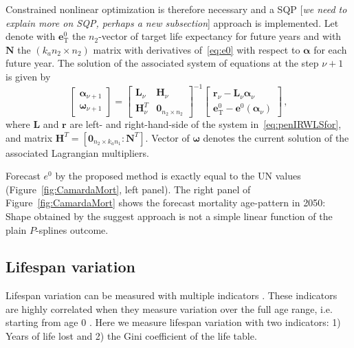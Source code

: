 \documentclass[a4paper,twoside, openright, 12pt, leqno]{article}
\begin{document}
Constrained nonlinear optimization is therefore necessary and a SQP [\textit{we need to explain more on SQP, perhaps a new subsection}] approach is implemented. Let denote with $\bm{e}^{0}_{\mathrm{T}}$ the $n_{2}$-vector of target life expectancy for future years and with $\bm{N}$ the $(k_{a}n_{2} \times n_{2})$ matrix with derivatives of~\eqref{eq:e0} with respect to $\bm{\alpha}$ for each future year. The solution of the associated system of equations at the step $\nu + 1$ is given by
\begin{equation}\label{eq:SQLalg}
\left[ \begin{array}{l}
\bm{\alpha}_{\nu+1}\\
\bm{\omega}_{\nu+1}
\end{array}\right] = 
\left[ \begin{array}{cl}
\bm{L}_{\nu}& \bm{H}_{\nu}\\
\bm{H}_{\nu}^{T} & \bm{0}_{n_{2} \times n_{2}}
\end{array}\right]^{-1}
\left[ \begin{array}{c}
\bm{r}_{\nu} - \bm{L}_{\nu}\bm{\alpha}_{\nu}\\
\bm{e}^{0}_{\mathrm{T}} - \bm{e}^{0} (\bm{\alpha}_{\nu})
\end{array}\right] \, ,
\end{equation}
where $\bm{L}$ and $\bm{r}$ are left- and right-hand-side of the system in~\eqref{eq:penIRWLSfor}, and matrix $\bm{H}^{T} = \left[\bm{0}_{n_{2}\times k_{a}n_{1}}:\bm{N}^{T}\right]$. Vector of $\bm{\omega}$ denotes the current solution of the associated Lagrangian multipliers.

Forecast $e^{0}$ by the proposed method is exactly equal to the UN values (Figure~\ref{fig:CamardaMort}, left panel). The right panel of Figure~\ref{fig:CamardaMort} shows the forecast mortality age-pattern in 2050: Shape obtained by the suggest approach is not a simple linear function of the plain $P$-splines outcome.

\subsection*{Lifespan variation}

Lifespan variation can be measured with multiple indicators \citep{vanRaalte2013}. These indicators are highly correlated when they measure variation over the full age range, i.e. starting from age 0 \citep{colchero2016emergence}. Here we measure lifespan variation with two indicators: 1) Years of life lost and 2) the Gini coefficient of the life table. 
\end{document}
